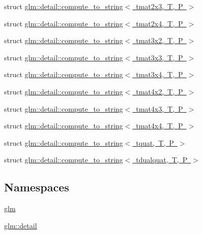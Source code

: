 \begin{DoxyCompactItemize}
\item 
struct \mbox{\hyperlink{structglm_1_1detail_1_1compute__to__string_3_01tmat2x3_00_01_t_00_01_p_01_4}{glm\+::detail\+::compute\+\_\+to\+\_\+string$<$ tmat2x3, T, P $>$}}
\item 
struct \mbox{\hyperlink{structglm_1_1detail_1_1compute__to__string_3_01tmat2x4_00_01_t_00_01_p_01_4}{glm\+::detail\+::compute\+\_\+to\+\_\+string$<$ tmat2x4, T, P $>$}}
\item 
struct \mbox{\hyperlink{structglm_1_1detail_1_1compute__to__string_3_01tmat3x2_00_01_t_00_01_p_01_4}{glm\+::detail\+::compute\+\_\+to\+\_\+string$<$ tmat3x2, T, P $>$}}
\item 
struct \mbox{\hyperlink{structglm_1_1detail_1_1compute__to__string_3_01tmat3x3_00_01_t_00_01_p_01_4}{glm\+::detail\+::compute\+\_\+to\+\_\+string$<$ tmat3x3, T, P $>$}}
\item 
struct \mbox{\hyperlink{structglm_1_1detail_1_1compute__to__string_3_01tmat3x4_00_01_t_00_01_p_01_4}{glm\+::detail\+::compute\+\_\+to\+\_\+string$<$ tmat3x4, T, P $>$}}
\item 
struct \mbox{\hyperlink{structglm_1_1detail_1_1compute__to__string_3_01tmat4x2_00_01_t_00_01_p_01_4}{glm\+::detail\+::compute\+\_\+to\+\_\+string$<$ tmat4x2, T, P $>$}}
\item 
struct \mbox{\hyperlink{structglm_1_1detail_1_1compute__to__string_3_01tmat4x3_00_01_t_00_01_p_01_4}{glm\+::detail\+::compute\+\_\+to\+\_\+string$<$ tmat4x3, T, P $>$}}
\item 
struct \mbox{\hyperlink{structglm_1_1detail_1_1compute__to__string_3_01tmat4x4_00_01_t_00_01_p_01_4}{glm\+::detail\+::compute\+\_\+to\+\_\+string$<$ tmat4x4, T, P $>$}}
\item 
struct \mbox{\hyperlink{structglm_1_1detail_1_1compute__to__string_3_01tquat_00_01_t_00_01_p_01_4}{glm\+::detail\+::compute\+\_\+to\+\_\+string$<$ tquat, T, P $>$}}
\item 
struct \mbox{\hyperlink{structglm_1_1detail_1_1compute__to__string_3_01tdualquat_00_01_t_00_01_p_01_4}{glm\+::detail\+::compute\+\_\+to\+\_\+string$<$ tdualquat, T, P $>$}}
\end{DoxyCompactItemize}
\subsection*{Namespaces}
\begin{DoxyCompactItemize}
\item 
 \mbox{\hyperlink{namespaceglm}{glm}}
\item 
 \mbox{\hyperlink{namespaceglm_1_1detail}{glm\+::detail}}
\end{DoxyCompactItemize}
